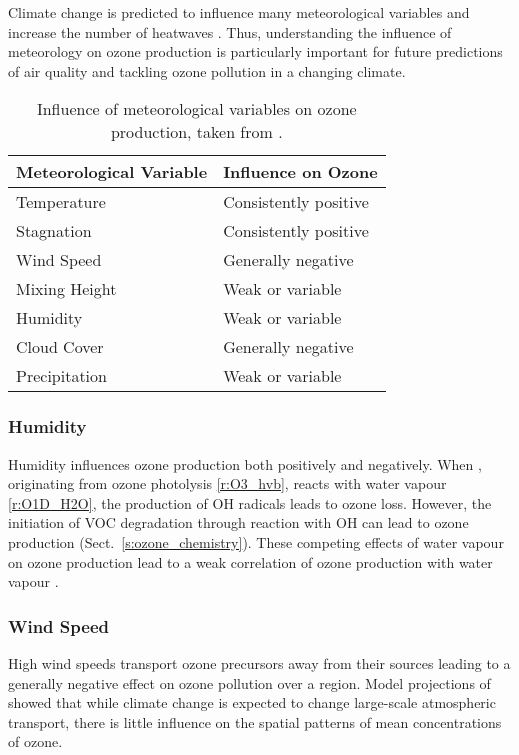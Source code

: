 Climate change is predicted to influence many meteorological variables and increase the number of heatwaves \citep{Karl:2003}.
Thus, understanding the influence of meteorology on ozone production is particularly important for future predictions of air quality and tackling ozone pollution in a changing climate.

\newpage
{%
    \renewcommand{\arraystretch}{1.1}%
    \begin{table}[t]%
        \centering%
        \caption[Influence of meteorological variables on ozone production]{Influence of meteorological variables on ozone production, taken from \citet{Jacob:2009}.}%
        \vspace{4mm}
        \begin{tabular}{ll}%
            \hline \hline
            \textbf{Meteorological Variable} & \textbf{Influence on Ozone} \\
            \hline \hline
            Temperature & Consistently positive \\
            Stagnation & Consistently positive \\
            Wind Speed & Generally negative \\
            Mixing Height & Weak or variable \\
            Humidity & Weak or variable \\
            Cloud Cover & Generally negative \\
            Precipitation & Weak or variable \\
            \hline \hline
        \end{tabular}%
        \vspace{9mm}
        \label{t:meteo_vars}%
    \end{table}%
}

\subsubsection{Humidity}
Humidity influences ozone production both positively and negatively.
When , originating from ozone photolysis \eqref{r:O3_hvb}, reacts with water vapour \eqref{r:O1D_H2O}, the production of OH radicals leads to ozone loss.
However, the initiation of VOC degradation through reaction with OH can lead to ozone production (Sect.~\ref{s:ozone_chemistry}).
These competing effects of water vapour on ozone production lead to a weak correlation of ozone production with water vapour \citep{Jacob:2009}.

\subsubsection{Wind Speed}
High wind speeds transport ozone precursors away from their sources leading to a generally negative effect on ozone pollution over a region.
Model projections of \citet{Doherty:2013} showed that while climate change is expected to change large-scale atmospheric transport, there is little influence on the spatial patterns of mean concentrations of ozone.


